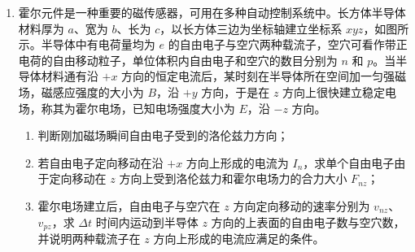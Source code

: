 \documentclass[\gkver]{gaokaozhenti}
\begin{document}
\begin{enumerate}

\item
霍尔元件是一种重要的磁传感器，可用在多种自动控制系统中。长方体半导体材料厚为 $a$、宽为 $b$、长为 $c$，以长方体三边为坐标轴建立坐标系 $xyz$，如图所示。半导体中有电荷量均为 $e$ 的自由电子与空穴两种载流子，空穴可看作带正电荷的自由移动粒子，单位体积内自由电子和空穴的数目分别为 $n$ 和 $p$。当半导体材料通有沿 $+x$ 方向的恒定电流后，某时刻在半导体所在空间加一匀强磁场，磁感应强度的大小为 $B$，沿 $+y$ 方向，于是在 $z$ 方向上很快建立稳定电场，称其为霍尔电场，已知电场强度大小为 $E$，沿 $-z$ 方向。
\begin{enumerate}
	\item
	判断刚加磁场瞬间自由电子受到的洛伦兹力方向；
	\item
	若自由电子定向移动在沿 $+x$ 方向上形成的电流为 $I_{n}$，求单个自由电子由于定向移动在 $z$ 方向上受到洛伦兹力和霍尔电场力的合力大小 $F_{nz}$；
	\item
	霍尔电场建立后，自由电子与空穴在 $z$ 方向定向移动的速率分别为 $v_{nz}$、$v_{pz}$，求 $\Delta t$ 时间内运动到半导体 $z$ 方向的上表面的自由电子数与空穴数，并说明两种载流子在 $z$ 方向上形成的电流应满足的条件。
\end{enumerate}


\end{enumerate}
\end{document}
